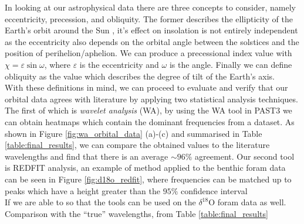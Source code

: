 \documentclass[12pt, onecolumn]{revtex4}    %
\begin{document}
In looking at our astrophysical data there are three concepts to consider, namely eccentricity, precession, and obliquity. The former describes the ellipticity of the Earth's orbit around the Sun \cite{carroll_astro}, it's effect on insolation is not entirely independent as the eccentricity also depends on the orbital angle between the solstices and the position of perihelion/aphelion. We can produce a precessional index value with $\chi= \varepsilon \sin{\omega}$, where $\varepsilon$ is the eccentricity and $\omega$ is the angle. Finally we can define obliquity as the value which describes the degree of tilt of the Earth's axis. \\

With these definitions in mind, we can proceed to evaluate and verify that our orbital data agrees with literature by applying two statistical analysis techniques. The first of which is \textit{wavelet analysis} (WA), by using the WA tool in PAST3 \cite{past3} we can obtain heatmaps which contain the dominant frequencies from a dataset. As shown in Figure \ref{fig:wa_orbital_data} (a)-(c) and summarised in Table \ref{table:final_results}, we can compare the obtained values to the literature wavelengths and find that there is an average $\sim 96 \%$ agreement. Our second tool is REDFIT analysis, an example of method applied to the benthic foram data can be seen in Figure \ref{fig:d18o_redfit}, where frequencies can be matched up to peaks which have a height greater than the $95\%$ confidence interval  \\

If we are able to so that the tools can be used on the $\delta^{18}$O foram data as well. \\

Comparison with the ``true'' wavelengths, from Table \ref{table:final_results} 

\newpage





\newpage
\end{document}
